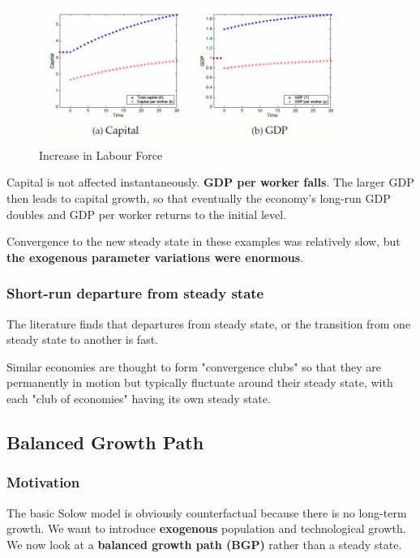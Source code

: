 \documentclass[11pt]{article}
\begin{document}
\begin{figure}[h]
    \centering
    \includegraphics[width=10cm]{photos/double L.png}
    \caption{Increase in Labour Force}
    \label{fig:increase L}
\end{figure}
\begin{intu}
    Capital is not affected instantaneously.\textbf{ GDP per worker falls}. The larger GDP then leads to capital growth, so that eventually the economy's long-run GDP doubles and GDP per worker returns to the initial level.
\end{intu}

\begin{note}
    Convergence to the new steady state in these examples was relatively slow, but \textbf{the exogenous parameter variations were enormous}. 
\end{note}

\subsubsection{Short-run departure from steady state}

The literature finds that departures from steady state, or the transition from one steady state to another is fast. 

Similar economies are thought to form "convergence clubs" so that they are permanently in motion but typically fluctuate around their steady state, with each "club of economies" having its own steady state.

\subsection{Balanced Growth Path}

\subsubsection{Motivation}

The basic Solow model is obviously counterfactual because there is no long-term growth. We want to introduce \textbf{exogenous} population and technological growth. We now look at a \textbf{balanced growth path (BGP)} rather than a steady state.
\end{document}
